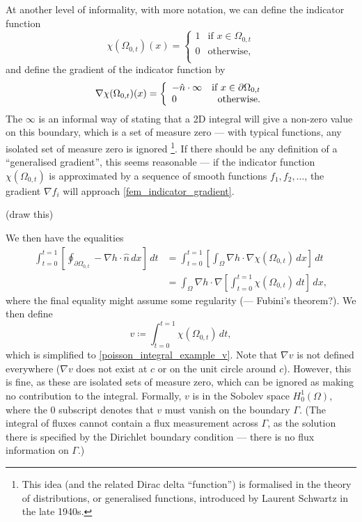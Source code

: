 At another level of informality, with more notation, we can define the indicator function
\begin{equation}\label{fem_indicator_function}
    \chi(\Omega_{0,t})(x) = 
    \left\{\begin{array}{lr}
        1 &\text{if $x \in \Omega_{0,t}$}\\
        0 &\text{otherwise},\\
        \end{array}\right.
\end{equation}
and define the gradient of the indicator function by
\begin{equation}\label{fem_indicator_gradient}
    \nabla\chi(\Omega_{0,t})(x) = 
    \left\{\begin{array}{lr}
        -\hat{n}\cdot\infty &\text{if $x \in {\partial\Omega}_{0,t}$}\\
        0 &\text{otherwise}.\\
        \end{array}\right.
\end{equation}
The $\infty$ is an informal way of stating that a 2D integral will give a non-zero value on this boundary,
which is a set of measure zero --- with typical functions, any isolated set of measure zero is ignored
\footnote{This idea (and the related
Dirac delta ``function'') is formalised in
the theory of distributions, or generalised functions, introduced by Laurent Schwartz in the late 1940s.}.
If there should be any definition of a ``generalised gradient'', this seems reasonable --- if the indicator function
$\chi(\Omega_{0,t})$ is approximated by a sequence of smooth functions $f_1, f_2,\ldots$, the gradient $\nabla f_i$
will approach \eqref{fem_indicator_gradient}.

\vskip 0.2in
(draw this)
\vskip 0.2in

We then have the equalities
\begin{align*}
    \int_{t=0}^{t=1}\left[\oint_{\partial\Omega_{0,t}} -\nabla h\cdot \hat{n}\,dx\right]\,dt
    &= \int_{t=0}^{t=1} \left[
        \int_\Omega \nabla h\cdot \nabla \chi(\Omega_{0,t})\,dx
    \right]\,dt
    \\
    &= \int_\Omega \nabla h \cdot \nabla \left[
        \int_{t=0}^{t=1}\chi(\Omega_{0,t})\,dt
    \right]\,dx,
\end{align*}
where the final equality might assume some regularity (--- Fubini's theorem?).
We then define
\begin{equation}\label{fem_v_definition}
    v \coloneqq \int_{t=0}^{t=1}\chi(\Omega_{0,t})\,dt,
\end{equation}
which is simplified to \eqref{poisson_integral_example_v}.
Note that $\nabla v$ is not defined everywhere ($\nabla v$ does not exist at $c$ or on the unit circle around $c$).
However, this is fine, as these are isolated sets of measure zero, which can be ignored as making no contribution to the integral.
Formally, $v$ is in the Sobolev space $H^1_0(\Omega)$, where the $0$ subscript denotes
that $v$ must vanish on the boundary $\Gamma$. (The integral of fluxes cannot contain a flux measurement
across $\Gamma$, as the solution there is specified by the Dirichlet boundary condition --- there is no flux information on $\Gamma$.)


